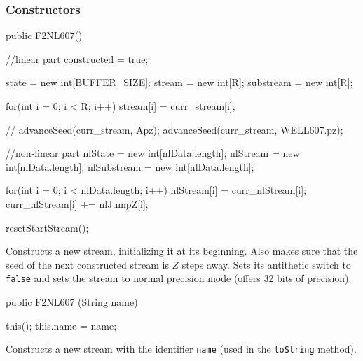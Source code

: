 \subsubsection* {Constructors}

\begin{code}
   public F2NL607() \begin{hide} {
      //linear part
      constructed = true;

      state = new int[BUFFER_SIZE];
      stream = new int[R];
      substream = new int[R];

      for(int i = 0; i < R; i++)
         stream[i] = curr_stream[i];

//    advanceSeed(curr_stream, Apz);
      advanceSeed(curr_stream, WELL607.pz);

      //non-linear part
      nlState = new int[nlData.length];
      nlStream = new int[nlData.length];
      nlSubstream = new int[nlData.length];

      for(int i = 0; i < nlData.length; i++) {
         nlStream[i] = curr_nlStream[i];
         curr_nlStream[i] += nlJumpZ[i];
      }

      resetStartStream();
   } \end{hide}
\end{code}
\begin{tabb} Constructs a new stream, initializing it at its beginning.
  Also makes sure that the seed of the next constructed stream is
  $Z$ steps away. Sets its antithetic switch to \texttt{false} and sets
  the stream to normal precision mode (offers 32 bits of precision).
\end{tabb}
\begin{code}

   public F2NL607 (String name) \begin{hide} {
      this();
      this.name = name;
   }\end{hide}
\end{code}
\begin{tabb} Constructs a new stream with the identifier \texttt{name}
  (used in the \texttt{toString} method).
\end{tabb}
\begin{htmlonly}
\end{htmlonly}
